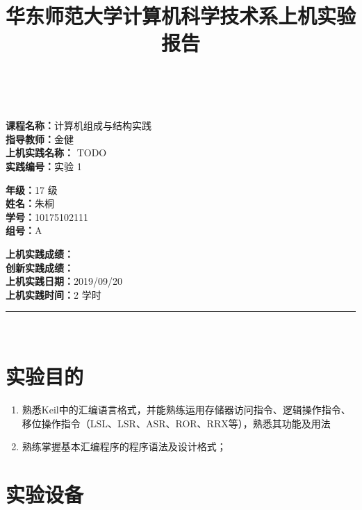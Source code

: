 \documentclass[a4paper,10pt,UTF8]{paper}
\title{华东师范大学计算机科学技术系上机实验报告}
\numberwithin{equation}{section}
\numberwithin{figure}{section}
\begin{document}
\pagestyle{fancy}
\lhead{}
\rhead{}
\makeatletter
\def\headrule{{\if@fancyplain\let\headrulewidth\plainheadrulewidth\fi%
\color{gray}\hrule\@height 0.2pt\@width\headwidth}
  \vspace{6mm}}
\makeatother

\newcommand{\HRule}{\rule{\linewidth}{1mm}}
\newcommand{\dai}{\textbf{Dais-CMX16$^+$}}

{ \\ [0.8cm]

\small{
  \begin{minipage}[t]{.32\linewidth}
    \textbf{课程名称：}计算机组成与结构实践\\
    \textbf{指导教师：}金健\\
    \textbf{上机实践名称：} TODO\\
    \textbf{实践编号：}实验 1
  \end{minipage}
  \begin{minipage}[t]{.32\linewidth}
    \textbf{年级：}17 级\\
    \textbf{姓名：}朱桐\\
    \textbf{学号：}10175102111\\
    \textbf{组号：}A
  \end{minipage} 
  \begin{minipage}[t]{.32\linewidth}
    \textbf{上机实践成绩：} \\
    \textbf{创新实践成绩：} \\
    \textbf{上机实践日期：}2019/09/20\\
    \textbf{上机实践时间：}2 学时\\
  \end{minipage}
}
\HRule \\[0.5cm]
}
\section{实验目的}

\begin{enumerate}
    \item 熟悉Keil中的汇编语言格式，并能熟练运用存储器访问指令、逻辑操作指令、移位操作指令（LSL、LSR、ASR、ROR、RRX等），熟悉其功能及用法
    \item 熟练掌握基本汇编程序的程序语法及设计格式；
\end{enumerate}

\section{实验设备}
\end{document}
